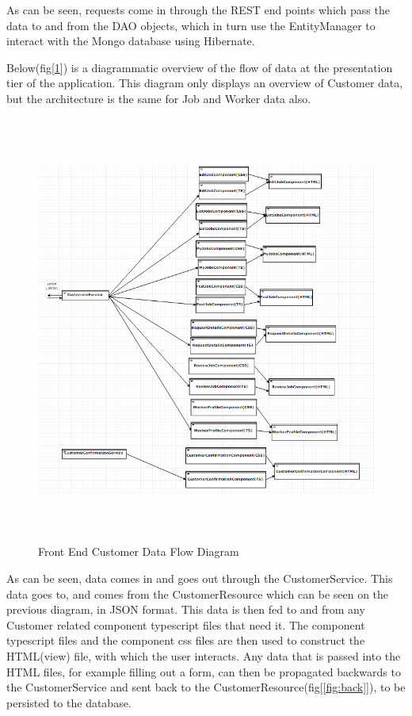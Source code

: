 
\bigskip

As can be seen, requests come in through the REST end points which pass the data to and from the DAO objects, which in turn use the EntityManager to interact with the Mongo database using Hibernate.


Below(fig[\ref{fig:front}]) is a diagrammatic overview of the flow of data at the presentation tier of the application. This diagram only displays an overview of Customer data, but the architecture is the same for Job and Worker data also. 

\begin{figure}[H]
    \centering
    \includegraphics[width=\textwidth, height=400pt]{DesignImages/FrontEnd.PNG}
    \caption{Front End Customer Data Flow Diagram}
    \label{fig:front}
\end{figure}

\bigskip

As can be seen, data comes in and goes out through the CustomerService. This data goes to, and comes from the CustomerResource which can be seen on the previous diagram, in JSON format. This data is then fed to and from any Customer related component typescript files that need it. The component typescript files and the component css files are then used to construct the HTML(view) file, with which the user interacts. Any data that is passed into the HTML files, for example filling out a form, can then be propagated backwards to the CustomerService and sent back to the CustomerResource(fig[\ref{fig:back}]), to be persisted to the database. 

